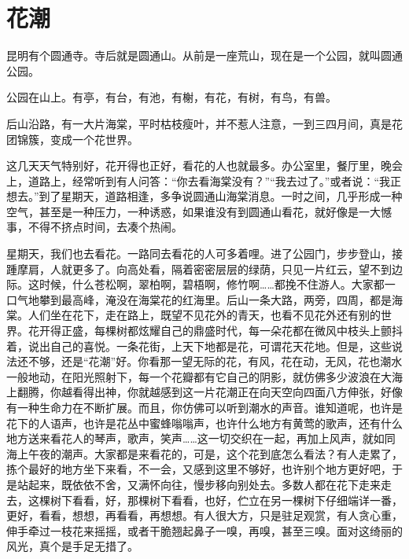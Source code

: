 \documentclass[12pt,UTF-8,openany]{ctexbook}
\begin{document}
\chapter{花潮}

\begin{large}
    
    昆明有个圆通寺。寺后就是圆通山。从前是一座荒山，现在是一个公园，就叫圆通公园。
    
    公园在山上。有亭，有台，有池，有榭，有花，有树，有鸟，有兽。
    
    后山沿路，有一大片海棠，平时枯枝瘦叶，并不惹人注意，一到三四月间，真是花团锦簇，变成一个花世界。
    
    这几天天气特别好，花开得也正好，看花的人也就最多。办公室里，餐厅里，晚会上，道路上，经常听到有人问答：“你去看海棠没有？”“我去过了。”或者说：“我正想去。”到了星期天，道路相逢，多争说圆通山海棠消息。一时之间，几乎形成一种空气，甚至是一种压力，一种诱惑，如果谁没有到圆通山看花，就好像是一大憾事，不得不挤点时间，去凑个热闹。
    
    星期天，我们也去看花。一路同去看花的人可多着哩。进了公园门，步步登山，接踵摩肩，人就更多了。向高处看，隔着密密层层的绿荫，只见一片红云，望不到边际。这时候，什么苍松啊，翠柏啊，碧梧啊，修竹啊……都挽不住游人。大家都一口气地攀到最高峰，淹没在海棠花的红海里。后山一条大路，两旁，四周，都是海棠。人们坐在花下，走在路上，既望不见花外的青天，也看不见花外还有别的世界。花开得正盛，每棵树都炫耀自己的鼎盛时代，每一朵花都在微风中枝头上颤抖着，说出自己的喜悦。一条花街，上天下地都是花，可谓花天花地。但是，这些说法还不够，还是“花潮”好。你看那一望无际的花，有风，花在动，无风，花也潮水一般地动，在阳光照射下，每一个花瓣都有它自己的阴影，就仿佛多少波浪在大海上翻腾，你越看得出神，你就越感到这一片花潮正在向天空向四面八方伸张，好像有一种生命力在不断扩展。而且，你仿佛可以听到潮水的声音。谁知道呢，也许是花下的人语声，也许是花丛中蜜蜂嗡嗡声，也许什么地方有黄莺的歌声，还有什么地方送来看花人的琴声，歌声，笑声……这一切交织在一起，再加上风声，就如同海上午夜的潮声。大家都是来看花的，可是，这个花到底怎么看法？有人走累了，拣个最好的地方坐下来看，不一会，又感到这里不够好，也许别个地方更好吧，于是站起来，既依依不舍，又满怀向往，慢步移向别处去。多数人都在花下走来走去，这棵树下看看，好，那棵树下看看，也好，伫立在另一棵树下仔细端详一番，更好，看看，想想，再看看，再想想。有人很大方，只是驻足观赏，有人贪心重，伸手牵过一枝花来摇摇，或者干脆翘起鼻子一嗅，再嗅，甚至三嗅。面对这绮丽的风光，真个是手足无措了。
    

\end{large}
\end{document}
